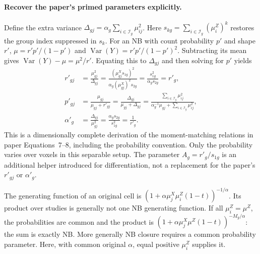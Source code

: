 \documentclass[11pt,a4paper]{article}
\newcommand{\Var}{\operatorname{Var}}
\numberwithin{equation}{section}
\begin{document}
\paragraph{Recover the paper's primed parameters explicitly.}
Define the extra variance
$\Delta_{gj}=\alpha_g\sum_{i\in\mathcal I_g}\mu_{ij}^2$.
Here $s_{kg}=\sum_{i\in\mathcal I_g}(\mu_i^Z)^k$ restores the
group index suppressed in $s_k$.
For an NB with count probability $p'$ and shape $r'$,
$\mu=r'p'/(1-p')$ and
$\Var(Y)=r'p'/(1-p')^2$. Subtracting its mean gives
$\Var(Y)-\mu=\mu^2/r'$.
Equating this to $\Delta_{gj}$ and then solving for $p'$ yields
\begin{align}
 r'_{gj}
 &=\frac{\mu_{gj}^2}{\Delta_{gj}}
   =\frac{(\mu_{gj}^X s_{1g})^2}
           {\alpha_g(\mu_{gj}^X)^2s_{2g}}
   =\frac{s_{1g}^2}{\alpha_gs_{2g}}=r'_g,\\
 p'_{gj}
 &=\frac{\mu_{gj}}{\mu_{gj}+r'_{gj}}
   =\frac{\Delta_{gj}}{\mu_{gj}+\Delta_{gj}}
   =\frac{\sum_{i\in\mathcal I_g}\mu_{ij}^2}
           {\alpha_g^{-1}\mu_{gj}+\sum_{i\in\mathcal I_g}\mu_{ij}^2},\\
 \alpha'_g
 &=\frac{\Delta_{gj}}{\mu_{gj}^2}
   =\frac{\alpha_gs_{2g}}{s_{1g}^2}=\frac1{r'_g}.
 \label{eq:paper-prime-derivation}
\end{align}
This is a dimensionally complete derivation of the moment-matching
relations in paper Equations~7--8, including the probability convention.
Only the probability varies over voxels in this separable setup.
The parameter $A_g=r'_g/s_{1g}$ is an additional helper introduced
for differentiation, not a replacement for the paper's $r'_{gj}$
or $\alpha'_g$.

The generating function of an original cell is
$(1+\alpha \mu_j^X\mu_i^Z(1-t))^{-1/\alpha}$.
Its product over studies is generally not one NB generating function.
If all $\mu_i^Z={\mu^Z}$, the probabilities are common and the product is
$(1+\alpha \mu_j^X\mu^Z(1-t))^{-M_g/\alpha}$: the sum is exactly NB.
More generally NB closure requires a common probability parameter.
Here, with common original $\alpha$, equal positive $\mu_i^Z$ supplies it.
\end{document}
